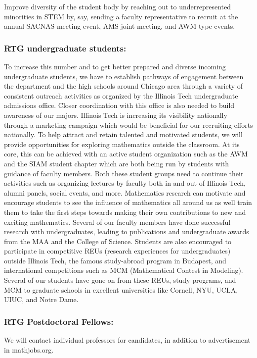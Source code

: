 \documentclass[11pt]{NSFamsart}
\begin{document}
Improve diversity of the student body by reaching out to underrepresented minorities in STEM by, say, sending a faculty representative to recruit at the annual SACNAS meeting event, AMS joint meeting, and AWM-type events.

 
  \subsubsection*{RTG undergraduate students:} 
 To increase this number and to get better prepared and diverse incoming undergraduate students,
we have to establish pathways of engagement between the department and the high schools around Chicago area through a variety of consistent outreach activities as organized by the Illinois Tech undergraduate admissions office. Closer coordination with this   office is also needed to build awareness of our majors. Illinois Tech  is increasing its visibility nationally through a marketing campaign which would be beneficial for our recruiting efforts nationally.
To help attract and retain talented and motivated students, we will provide opportunities for exploring mathematics outside the classroom. At its core, this can be achieved with an active student organization such as the AWM and the SIAM student chapter which are both being run by students with guidance of faculty members. Both these student groups need to continue their activities such as organizing lectures by faculty both in and out of Illinois Tech, alumni panels, social events, and more. Mathematics research can motivate and encourage students to see the influence of mathematics all around us as well train them to take the first steps towards making their own contributions to new and exciting mathematics. Several of our faculty members have done successful research with undergraduates, leading to publications and undergraduate awards from the MAA and the College of Science. Students are also encouraged to participate in competitive REUs (research experiences for undergraduates) outside Illinois Tech, the famous study-abroad program in Budapest, and international competitions such as MCM (Mathematical Contest in Modeling). Several of our students have gone on from these REUs, study programs, and MCM to graduate schools in excellent universities like Cornell, NYU, UCLA, UIUC, and Notre Dame.

\subsubsection*{RTG Postdoctoral Fellows:} We will contact individual professors for candidates, in addition to advertisement in mathjobs.org.
\end{document}
